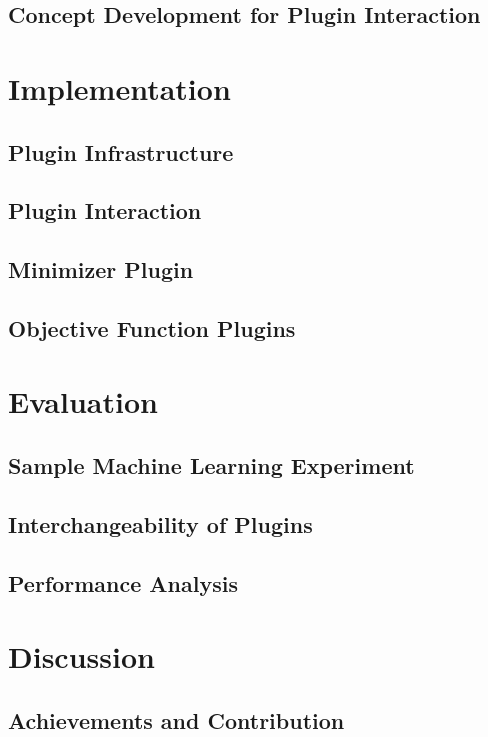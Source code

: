 \documentclass[
  a4paper,  %
  twoside,  %
  bibliography=totoc,
  headsepline,
  cleardoublepage=empty,
  parskip=half,
  draft=false
]{scrbook}
\begin{document}
\section*{Concept Development for Plugin Interaction}
\label{sec:conceptDevelopment}

\chapter{Implementation}
\label{chap:implementation}
\section{Plugin Infrastructure}
\label{sec:pluginInfrastructure}
\section{Plugin Interaction}
\label{sec:pluginInteraction}
\section{Minimizer Plugin}
\label{sec:minimizerPlugin}
\section{Objective Function Plugins}
\label{sec:objectiveFunctionPlugins}


\chapter{Evaluation}
\label{chap:evaluation}
\section{Sample Machine Learning Experiment}
\label{sec:sampleMachineLearningExperiment}
\section{Interchangeability of Plugins}
\label{sec:interchangeabilityOfPlugins}
\section{Performance Analysis}
\label{sec:performanceAnalysis}

\chapter*{Discussion}
\label{chap:discussion}
\section*{Achievements and Contribution}
\label{sec:achievementsAndContribution}
\end{document}
